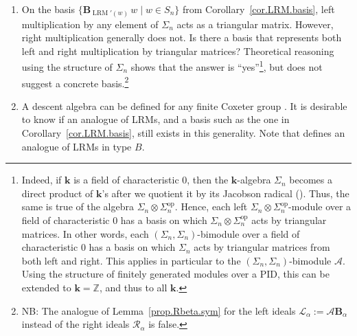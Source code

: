 \documentclass[submission]{FPSAC2026}
\newcommand{\ZZ}{\mathbb{Z}} %
\newcommand{\kk}{\mathbf{k}} %
\newcommand{\BB}{\mathbf{B}} %
\begin{document}
\begin{enumerate}

\item[\textbf{1.}]
On the basis $\bigl\{
\mathbf{B}_{\operatorname{LRM}'(w)}\, w
\;\big|\; w\in S_n \bigr\}$
from Corollary~\ref{cor.LRM.basis}, left multiplication
by any element of $\Sigma_n$ acts as a triangular matrix.
However, right multiplication generally does not.
Is there a basis that represents both left and right
multiplication by triangular matrices?
Theoretical reasoning using the structure of $\Sigma_n$
shows that the answer is ``yes''\footnote{Indeed, if
$\kk$ is a field of characteristic $0$, then the
$\kk$-algebra $\Sigma_n$ becomes a direct product of
$\kk$'s after we quotient it by its Jacobson radical
(\cite[\S 5.2]{Sch05}).
Thus, the same is true of the algebra
$\Sigma_n \otimes \Sigma_n^{\operatorname{op}}$.
Hence, each
left $\Sigma_n \otimes \Sigma_n^{\operatorname{op}}$-module
over a field of characteristic $0$ has a basis on which
$\Sigma_n \otimes \Sigma_n^{\operatorname{op}}$ acts by
triangular matrices.
In other words, each
\((\Sigma_n,\Sigma_n)\)-bimodule
over a field of characteristic $0$ has a basis on which
\(\Sigma_n\) acts by triangular matrices from both left
and right.
This applies in particular to the
\((\Sigma_n,\Sigma_n)\)-bimodule \(\mathcal{A}\).
Using the structure of finitely generated modules over
a PID, this can be
extended to $\kk = \ZZ$, and thus to all $\kk$.}, but does not
suggest a concrete basis.\footnote{NB: The
analogue of Lemma~\ref{prop.Rbeta.sym} for the left
ideals $\mathcal{L}_\alpha := \mathcal{A} \BB_\alpha$
instead of the right ideals $\mathcal{R}_\alpha$ is false.}

\item[\textbf{2.}]
A descent algebra can be defined for any finite Coxeter group \cite{Sol76}.
It is desirable to know if an analogue of LRMs, and a basis such
as the one in Corollary~\ref{cor.LRM.basis}, still exists in this generality.
Note that \cite[\S 3]{ChenGongGuo13} defines an analogue of LRMs in type $B$.

\end{enumerate}

\printbibliography
\end{document}
